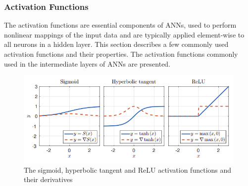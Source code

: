         \subsubsection{Activation Functions}
            The activation functions are essential components of ANNs, used to perform nonlinear mappings of the input data and are typically applied element-wise to all
            neurons in a hidden layer. This section describes a few commonly used activation
            functions and their properties. The activation functions commonly used in the
            intermediate layers of ANNs are presented.
            \begin{figure}[H]
                \centering
                \includegraphics[width=0.6\linewidth]{img/sigmoid.png}
                \caption{The sigmoid, hyperbolic tangent and ReLU activation functions and
                their derivatives}
            \end{figure}
